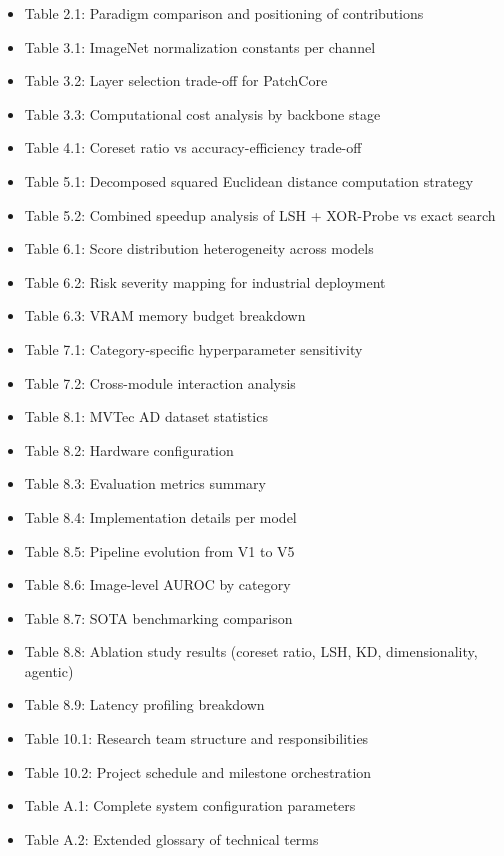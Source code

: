 \begin{itemize}
\tightlist
\item
  Table 2.1: Paradigm comparison and positioning of contributions
\item
  Table 3.1: ImageNet normalization constants per channel
\item
  Table 3.2: Layer selection trade-off for PatchCore
\item
  Table 3.3: Computational cost analysis by backbone stage
\item
  Table 4.1: Coreset ratio vs accuracy-efficiency trade-off
\item
  Table 5.1: Decomposed squared Euclidean distance computation strategy
\item
  Table 5.2: Combined speedup analysis of LSH + XOR-Probe vs exact search
\item
  Table 6.1: Score distribution heterogeneity across models
\item
  Table 6.2: Risk severity mapping for industrial deployment
\item
  Table 6.3: VRAM memory budget breakdown
\item
  Table 7.1: Category-specific hyperparameter sensitivity
\item
  Table 7.2: Cross-module interaction analysis
\item
  Table 8.1: MVTec AD dataset statistics
\item
  Table 8.2: Hardware configuration
\item
  Table 8.3: Evaluation metrics summary
\item
  Table 8.4: Implementation details per model
\item
  Table 8.5: Pipeline evolution from V1 to V5
\item
  Table 8.6: Image-level AUROC by category
\item
  Table 8.7: SOTA benchmarking comparison
\item
  Table 8.8: Ablation study results (coreset ratio, LSH, KD, dimensionality, agentic)
\item
  Table 8.9: Latency profiling breakdown
\item
  Table 10.1: Research team structure and responsibilities
\item
  Table 10.2: Project schedule and milestone orchestration
\item
  Table A.1: Complete system configuration parameters
\item
  Table A.2: Extended glossary of technical terms
\end{itemize}


